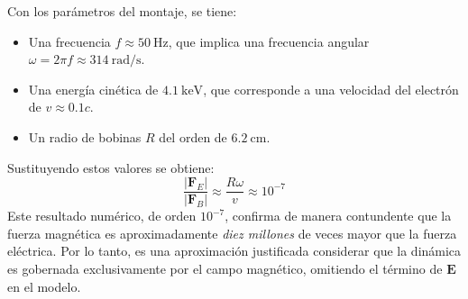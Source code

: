 Con los parámetros del montaje, se tiene:
%
\begin{itemize}
	\item Una frecuencia $f \approx \qty{50}{\hertz}$, que implica una frecuencia
		angular $\omega = 2\pi f \approx \qty{314}{\radian\per\second}$.
	\item Una energía cinética de $\qty{4.1}{\kilo\eV}$, que corresponde a una
		velocidad del electrón de $v \approx 0.1c$.
	\item Un radio de bobinas $R$ del orden de $\qty{6.2}{\centi\meter}$.
\end{itemize}
%
Sustituyendo estos valores se obtiene:
%
$$
\frac{|\boldsymbol{F}_E|}{|\boldsymbol{F}_B|} \approx \frac{R\omega}{v}
\approx 10^{-7}
$$
%
Este resultado numérico, de orden $10^{-7}$, confirma de manera
contundente que la fuerza magnética es aproximadamente \emph{diez millones} de
veces mayor que la fuerza eléctrica. Por lo tanto, es una aproximación
justificada considerar que la dinámica es gobernada
exclusivamente por el campo magnético, omitiendo el término de
$\boldsymbol{E}$ en el modelo.
